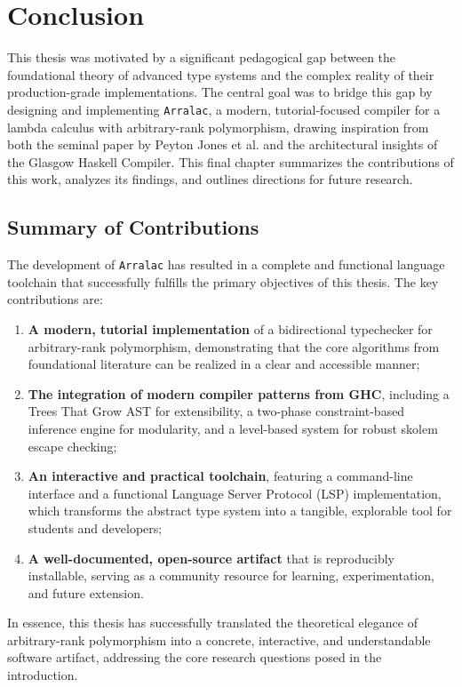 \chapter{Conclusion}
\label{chap:Conclusion}

This thesis was motivated by a significant pedagogical gap between the foundational theory of advanced type systems and the complex reality of their production-grade implementations. The central goal was to bridge this gap by designing and implementing \texttt{Arralac}, a modern, tutorial-focused compiler for a lambda calculus with arbitrary-rank polymorphism, drawing inspiration from both the seminal paper by Peyton Jones et al. \cite{jones-practical-2007} and the architectural insights of the Glasgow Haskell Compiler. This final chapter summarizes the contributions of this work, analyzes its findings, and outlines directions for future research.

\section{Summary of Contributions}
The development of \texttt{Arralac} has resulted in a complete and functional language toolchain that successfully fulfills the primary objectives of this thesis. The key contributions are:
\begin{enumerate}
    \item \textbf{A modern, tutorial implementation} of a bidirectional typechecker for arbitrary-rank polymorphism, demonstrating that the core algorithms from foundational literature can be realized in a clear and accessible manner;
    \item \textbf{The integration of modern compiler patterns from GHC}, including a Trees That Grow AST for extensibility, a two-phase constraint-based inference engine for modularity, and a level-based system for robust skolem escape checking;
    \item \textbf{An interactive and practical toolchain}, featuring a command-line interface and a functional Language Server Protocol (LSP) implementation, which transforms the abstract type system into a tangible, explorable tool for students and developers;
    \item \textbf{A well-documented, open-source artifact} that is reproducibly installable, serving as a community resource for learning, experimentation, and future extension.
\end{enumerate}
In essence, this thesis has successfully translated the theoretical elegance of arbitrary-rank polymorphism into a concrete, interactive, and understandable software artifact, addressing the core research questions posed in the introduction.

